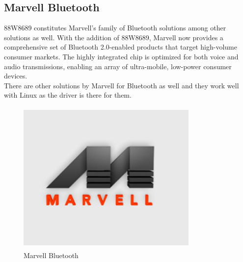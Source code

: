 \subsection{Marvell Bluetooth}
88W8689 constitutes Marvell’s family of Bluetooth solutions among other solutions as well. With the addition of 88W8689, Marvell now provides a comprehensive set of Bluetooth 2.0-enabled products that target high-volume consumer markets. The highly integrated chip is optimized for both voice and audio transmissions, enabling an array of ultra-mobile, low-power consumer devices. \\
There are other solutions by Marvell for Bluetooth as well and they work well with Linux as the driver is there for them.
\begin{figure}[ht]
	\centering
	\includegraphics[width=3.5in, height=3in]{images/marvell_bluetooth.png}
	\caption{Marvell Bluetooth}
\end{figure}
